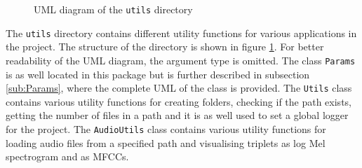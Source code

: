 \begin{figure}[htbp]
{
    }
	\caption{UML diagram of the \texttt{utils} directory}
	\label{fig:UML-Utils}
\end{figure}
\noindent
The \texttt{utils} directory contains different utility functions for various applications in the project. The structure of the directory is shown in figure \ref{fig:UML-Utils}. For better readability of the UML diagram, the argument type is omitted. The class \texttt{Params} is as well located in this package but is further described in subsection \ref{sub:Params}, where the complete UML of the class is provided.
\newline
\newline
The \texttt{Utils} class contains various utility functions for creating folders, checking if the path exists, getting the number of files in a path and it is as well used to set a global logger for the project.
\newline
\newline
The \texttt{AudioUtils} class contains various utility functions for loading audio files from a specified path and visualising triplets as log Mel spectrogram and as \glspl{MFCC}.
\newline
